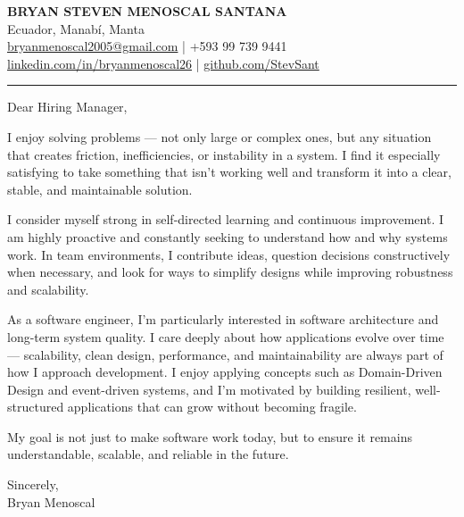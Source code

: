 \documentclass[11pt, a4paper]{article}
\begin{document}
{\large \textbf{BRYAN STEVEN MENOSCAL SANTANA}} \\
Ecuador, Manabí, Manta \\
\href{mailto:bryanmenoscal2005@gmail.com}{bryanmenoscal2005@gmail.com} \quad | \quad +593 99 739 9441 \\
\href{https://linkedin.com/in/bryanmenoscal26}{linkedin.com/in/bryanmenoscal26} \quad | \quad \href{https://github.com/StevSant}{github.com/StevSant}

\vspace{6pt}
\hrule
\vspace{12pt}

Dear Hiring Manager,

I enjoy solving problems --- not only large or complex ones, but any situation that creates friction, inefficiencies, or instability in a system. I find it especially satisfying to take something that isn't working well and transform it into a clear, stable, and maintainable solution.

I consider myself strong in self-directed learning and continuous improvement. I am highly proactive and constantly seeking to understand how and why systems work. In team environments, I contribute ideas, question decisions constructively when necessary, and look for ways to simplify designs while improving robustness and scalability.

As a software engineer, I'm particularly interested in software architecture and long-term system quality. I care deeply about how applications evolve over time --- scalability, clean design, performance, and maintainability are always part of how I approach development. I enjoy applying concepts such as Domain-Driven Design and event-driven systems, and I'm motivated by building resilient, well-structured applications that can grow without becoming fragile.

My goal is not just to make software work today, but to ensure it remains understandable, scalable, and reliable in the future.

\vspace{12pt}
Sincerely, \\
Bryan Menoscal
\end{document}
